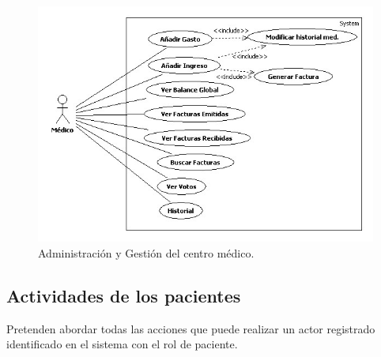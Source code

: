 					\begin{figure}[H]
					  \centering
					    \includegraphics[width=14cm]{img/jpg/casos_uso/Administracion_y_Gestion.jpg}
					  \caption{Administración y Gestión del centro médico.}
					  \label{fig:ad_ges_med}
					\end{figure}


			\subsection{Actividades de los pacientes} %
			\label{sec:actividades_de_los_pacientes}
			Pretenden abordar todas las acciones que puede realizar un actor registrado identificado en el sistema con el rol de paciente.
